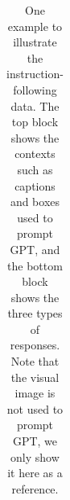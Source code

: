 \begin{table}[t!]
\begin{minipage}{1.0\columnwidth}
\begin{tcolorbox}
\begin{tabular}{p{} c}
    \end{tabular}
\end{tcolorbox}
\vspace{-2mm}
\caption{One example to illustrate the instruction-following data. The top block shows the contexts such as captions and boxes used to prompt GPT, and the bottom block shows the three types of responses. Note that the visual image is not used to prompt GPT, we only show it here as a reference.}
    \label{tab:full_example_car_bbox}
\end{minipage}
\end{table}


\begin{table}[h!]\centering
\begin{minipage}{0.99\columnwidth}\vspace{0mm}    \centering
\begin{tcolorbox} 
    \centering
   

\end{tcolorbox}
\end{minipage}
\end{table}
